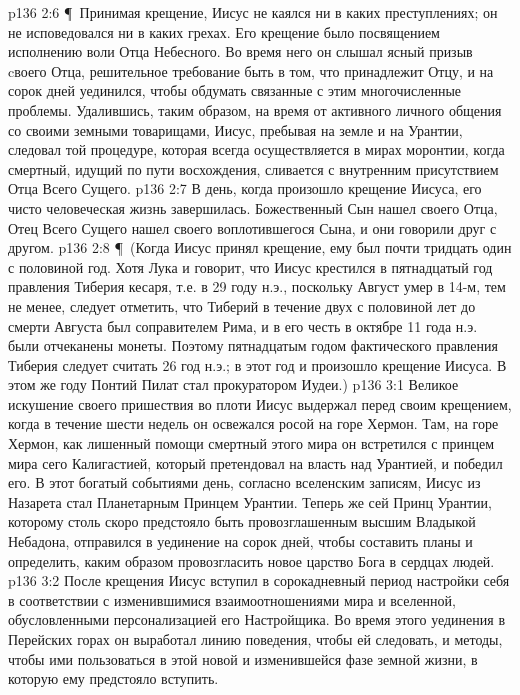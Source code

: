 \vs p136 2:6 \P\ Принимая крещение, Иисус не каялся ни в каких преступлениях; он не исповедовался ни в каких грехах. Его крещение было посвящением исполнению воли Отца Небесного. Во время него он слышал ясный призыв cвоего Отца, решительное требование быть в том, что принадлежит Отцу, и на сорок дней уединился, чтобы обдумать связанные с этим многочисленные проблемы. Удалившись, таким образом, на время от активного личного общения со своими земными товарищами, Иисус, пребывая на земле и на Урантии, следовал той процедуре, которая всегда осуществляется в мирах моронтии, когда смертный, идущий по пути восхождения, сливается с внутренним присутствием Отца Всего Сущего.
\vs p136 2:7 В день, когда произошло крещение Иисуса, его чисто человеческая жизнь завершилась. Божественный Сын нашел своего Отца, Отец Всего Сущего нашел своего воплотившегося Сына, и они говорили друг с другом.
\vs p136 2:8 \P\ (Когда Иисус принял крещение, ему был почти тридцать один с половиной год. Хотя Лука и говорит, что Иисус крестился в пятнадцатый год правления Тиберия кесаря, т.е. в 29 году н.э., поскольку Август умер в 14\hyp{}м, тем не менее, следует отметить, что Тиберий в течение двух с половиной лет до смерти Августа был соправителем Рима, и в его честь в октябре 11 года н.э. были отчеканены монеты. Поэтому пятнадцатым годом фактического правления Тиберия следует считать 26 год н.э.; в этот год и произошло крещение Иисуса. В этом же году Понтий Пилат стал прокуратором Иудеи.)
\vs p136 3:1 Великое искушение своего пришествия во плоти Иисус выдержал перед своим крещением, когда в течение шести недель он освежался росой на горе Хермон. Там, на горе Хермон, как лишенный помощи смертный этого мира он встретился с принцем мира сего Калигастией, который претендовал на власть над Урантией, и победил его. В этот богатый событиями день, согласно вселенским записям, Иисус из Назарета стал Планетарным Принцем Урантии. Теперь же сей Принц Урантии, которому столь скоро предстояло быть провозглашенным высшим Владыкой Небадона, отправился в уединение на сорок дней, чтобы составить планы и определить, каким образом провозгласить новое царство Бога в сердцах людей.
\vs p136 3:2 После крещения Иисус вступил в сорокадневный период настройки себя в соответствии с изменившимися взаимоотношениями мира и вселенной, обусловленными персонализацией его Настройщика. Во время этого уединения в Перейских горах он выработал линию поведения, чтобы ей следовать, и методы, чтобы ими пользоваться в этой новой и изменившейся фазе земной жизни, в которую ему предстояло вступить.
